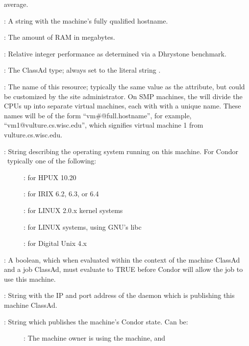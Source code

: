 \begin{description}
average.
%
\item[\AdAttr{Machine}] : A string with the machine's fully qualified hostname.
%
\item[\AdAttr{Memory}] : The amount of RAM in megabytes.
%
\item[\AdAttr{Mips}] : Relative integer performance as determined via a Dhrystone
benchmark.
%
\item[\AdAttr{MyType}] : The ClassAd type; always set to the literal string .
%
\item[\AdAttr{Name}] : The name of this resource; typically the same value as
the  attribute, but could be customized by the site
administrator.
On SMP machines, the  will divide the CPUs up into separate
virtual machines, each with with a unique name.
These names will be of the form ``vm\#@full.hostname'', for example,
``vm1@vulture.cs.wisc.edu'', which signifies virtual machine 1 from
vulture.cs.wisc.edu. 
%
\item[\AdAttr{OpSys}] : String describing the operating system running on this
machine.  For Condor \VersionNotice\ typically one of the following:
	\begin{description}
	\item[] : for HPUX 10.20
	\item[]  : for IRIX 6.2, 6.3, or 6.4
	\item[]  : for LINUX 2.0.x kernel systems
	\item[]  : for LINUX systems, using GNU's libc
	\item[]  : for Digital Unix 4.x
	\item[]
	\item[]
	\end{description}
%
\item[\AdAttr{Requirements}] : A boolean, which when evaluated within the context
of the machine ClassAd and a job ClassAd, must evaluate to
TRUE before Condor will allow the job to use this machine.
%
\item[\AdAttr{StartdIpAddr}] : String with the IP and port address of the
 daemon which is publishing this machine ClassAd.
%
\item[\AdAttr{State}] : String which publishes the machine's Condor state.
Can be:
	\begin{description}
	\item[] : The machine owner is using the machine, and

\end{description}
\end{description}
